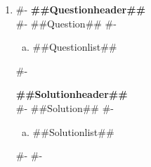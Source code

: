 \documentclass[10pt,twocolumn]{article}
\begin{document}

\begin{enumerate}[leftmargin=*]
#-
  \item
#-
  \textbf{##Questionheader##}\\
#-
  ##Question##
#-
  \begin{enumerate}[(a)]
    \item ##Questionlist##
  \end{enumerate}
#-

  \textbf{##Solutionheader##}\\
#-
  ##Solution##
#-
  \begin{enumerate}[(a)]
    \item ##Solutionlist##
  \end{enumerate}
#-
#-
\end{enumerate}
\end{document}
